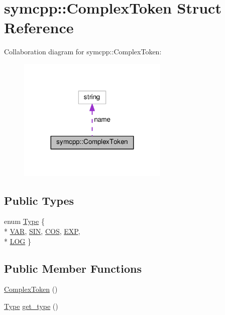 \hypertarget{structsymcpp_1_1ComplexToken}{}\section{symcpp\+:\+:Complex\+Token Struct Reference}
\label{structsymcpp_1_1ComplexToken}


Collaboration diagram for symcpp\+:\+:Complex\+Token\+:\nopagebreak
\begin{figure}[H]
\begin{center}
\leavevmode
\includegraphics[width=203pt]{structsymcpp_1_1ComplexToken__coll__graph}
\end{center}
\end{figure}
\subsection*{Public Types}
\begin{DoxyCompactItemize}
\item 
enum \hyperlink{structsymcpp_1_1ComplexToken_a5d5ae44d6f5862b7e3a409156ac54ae3}{Type} \{ \\*
\hyperlink{structsymcpp_1_1ComplexToken_a5d5ae44d6f5862b7e3a409156ac54ae3abd5d4f26be00a727b2a32f52b9d3d475}{V\+AR}, 
\hyperlink{structsymcpp_1_1ComplexToken_a5d5ae44d6f5862b7e3a409156ac54ae3a9d5179f6cc5d8de195f45da25251e202}{S\+IN}, 
\hyperlink{structsymcpp_1_1ComplexToken_a5d5ae44d6f5862b7e3a409156ac54ae3a3247d8325a85d40c7d15ca05421b1c5e}{C\+OS}, 
\hyperlink{structsymcpp_1_1ComplexToken_a5d5ae44d6f5862b7e3a409156ac54ae3aa36465d09ca3bafd575190cd520a30d8}{E\+XP}, 
\\*
\hyperlink{structsymcpp_1_1ComplexToken_a5d5ae44d6f5862b7e3a409156ac54ae3a2f7e0212929c29739ab0e1966aa2990a}{L\+OG}
 \}
\end{DoxyCompactItemize}
\subsection*{Public Member Functions}
\begin{DoxyCompactItemize}
\item 
\hyperlink{structsymcpp_1_1ComplexToken_ab67322955478ca18076d0d0d9bc985bd}{Complex\+Token} ()
\item 
\hyperlink{structsymcpp_1_1ComplexToken_a5d5ae44d6f5862b7e3a409156ac54ae3}{Type} \hyperlink{structsymcpp_1_1ComplexToken_a86c40584c46720a630fa840b5d330f63}{get\+\_\+type} ()
\end{DoxyCompactItemize}
